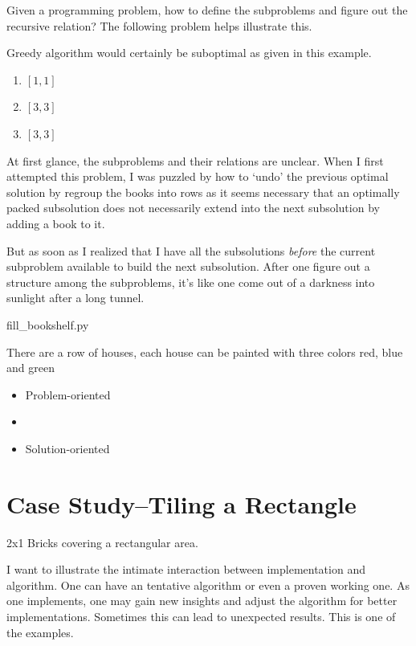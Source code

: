 Given a programming problem, how to define the subproblems and figure out the recursive relation?
The following problem helps illustrate this.

Greedy algorithm would certainly be suboptimal as given in this example.
\begin{enumerate}
    \item $[1, 1]$
    \item $[3, 3]$
    \item $[3, 3]$
\end{enumerate}

At first glance, the subproblems and their relations are unclear.
When I first attempted this problem, I was puzzled by how to `undo' the previous optimal solution
by regroup the books into rows as it seems necessary that an optimally packed subsolution does
not necessarily extend into the next subsolution by adding a book to it.

But as soon as I realized that I have all the subsolutions \emph{before} the current subproblem
available to build the next subsolution.
After one figure out a structure among the subproblems, it's like one come out of a darkness
into sunlight after a long tunnel.
\begin{clisting}
    
    {fill_bookshelf.py}
\end{clisting}

There are a row of houses, each house can be painted with three colors red, blue and green
\label{Evernote:Paint House (I and II)}
\begin{itemize}
    \item Problem-oriented\label{Evernote:Split "bothearthandsaturnspin" into words word break wordbreak}
    \item \item Solution-oriented
\end{itemize}

\section{Case Study--Tiling a Rectangle} \label{sec:tiling-rectangle}
\label{Evernote:2x1 brick paving problem tiling}
2x1 Bricks covering a rectangular area.

I want to illustrate the intimate interaction between implementation and algorithm.
One can have an tentative algorithm or even a proven working one.
As one implements, one may gain new insights and adjust the algorithm for better implementations.
Sometimes this can lead to unexpected results.
This is one of the examples.

